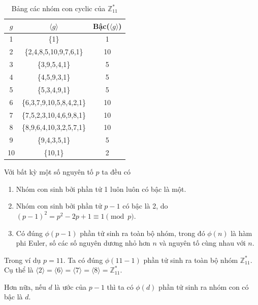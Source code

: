 \documentclass[../main.tex]{subfiles}
\begin{document}
\begin{table}[h!]
    \centering
    
    \begin{tabular}{||c c c||}
    \hline
    $g$  & $\langle g \rangle$        & Bậc($\langle g \rangle$)   \\
    \hline \hline
    1  & \{1\}                    & 1  \\
    2  & \{2,4,8,5,10,9,7,6,1\}   & 10 \\
    3  & \{3,9,5,4,1\}            & 5  \\
    4  & \{4,5,9,3,1\}            & 5  \\
    5  & \{5,3,4,9,1\}            & 5  \\
    6  & \{6,3,7,9,10,5,8,4,2,1\} & 10 \\
    7  & \{7,5,2,3,10,4,6,9,8,1\} & 10 \\
    8  & \{8,9,6,4,10,3,2,5,7,1\} & 10 \\
    9  & \{9,4,3,5,1\}            & 5  \\
    10 & \{10,1\}                 & 2 \\
    \hline
    \end{tabular}
    \caption{Bảng các nhóm con cyclic của $\mathbb{Z}_{11}^*$}
    \label{fig:subCyclic}
\end{table}
\begin{nx}
Với bất kỳ một số nguyên tố $p$ ta đều có
\begin{enumerate}
    \item Nhóm con sinh bởi phần tử 1 luôn luôn có bậc là một.
    \item Nhóm con sinh bởi phần tử $p-1$ có bậc là 2, do $(p-1)^2 =p^2 -2p +1 \equiv 1\pmod p$.
    \item Có đúng $\phi(p-1)$ phần tử sinh ra toàn bộ nhóm, trong đó $\phi(n)$ là hàm phi Euler, số các số nguyên dương nhỏ hơn $n$ và nguyên tố cùng nhau với $n$.
\end{enumerate}
\end{nx}

Trong ví dụ $p = 11$. Ta có đúng $\phi(11-1)$ phần tử sinh ra toàn bộ nhóm $\mathbb{Z}^*_{11}$. Cụ thể là $\langle 2 \rangle = \langle 6 \rangle = \langle 7 \rangle = \langle 8 \rangle = \mathbb{Z}^*_{11}$.

Hơn nữa, nếu $d$ là ước của $p-1$ thì ta có $\phi(d)$ phần tử sinh ra nhóm con có bậc là $d$.
\end{document}
